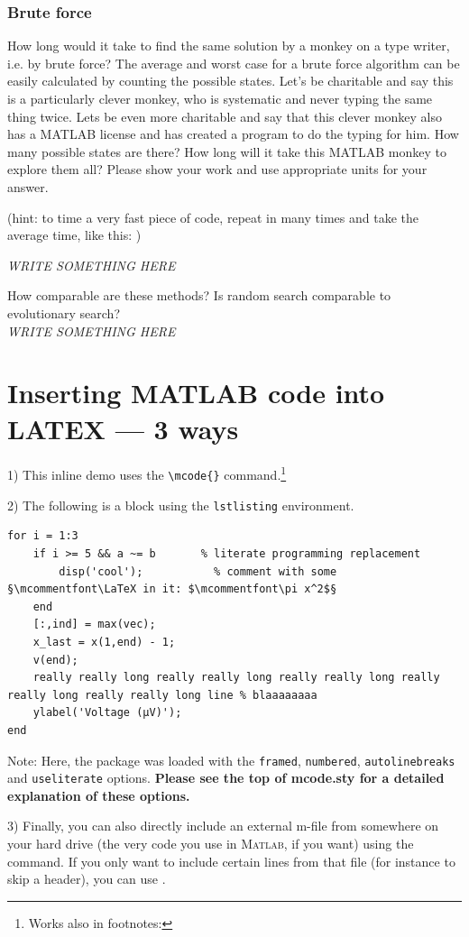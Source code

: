 \documentclass{article}
\begin{document}
\newpage
\subsubsection{Brute force}
How long would it take to find the same solution by a monkey on a type writer, i.e. by brute force? The average and worst case for a brute force algorithm can be easily calculated by counting the possible states. Let's be charitable and say this is a particularly clever monkey, who is systematic and never typing the same thing twice. Lets be even more charitable and say that this clever monkey also has a MATLAB license and has created a program to do the typing for him. How many possible states are there? How long will it take this MATLAB monkey to explore them all? Please show your work and use appropriate units for your answer.

(hint: to time a very fast piece of code, repeat in many times and take the average time, like this: )



\textit{
\color{red}WRITE SOMETHING HERE
}

\vspace{3cm}
How comparable are these methods? Is random search comparable to evolutionary search?\\
\textit{
\color{red}WRITE SOMETHING HERE
}






\newpage
\section{Inserting MATLAB code into LATEX --- 3 ways}

1) This inline demo  uses the \verb|\mcode{}| command.\footnote{Works also in footnotes: }

2) The following is a block using the \verb|lstlisting| environment.
\begin{lstlisting}
for i = 1:3
	if i >= 5 && a ~= b       % literate programming replacement
		disp('cool');           % comment with some §\mcommentfont\LaTeX in it: $\mcommentfont\pi x^2$§
	end
	[:,ind] = max(vec);
	x_last = x(1,end) - 1;
	v(end);
	really really long really really long really really long really really long really really long line % blaaaaaaaa
	ylabel('Voltage (µV)');
end
\end{lstlisting}
Note: Here, the package was loaded with the \verb|framed|, \verb|numbered|, \verb|autolinebreaks| and \verb|useliterate| options.  \textbf{Please see the top of mcode.sty for a detailed explanation of these options.}


3) Finally, you can also directly include an external m-file from somewhere on your hard drive (the very code you use in \textsc{Matlab}, if you want) using the \verb|| command.  If you only want to include certain lines from that file (for instance to skip a header), you can use \verb||.
\end{document}
